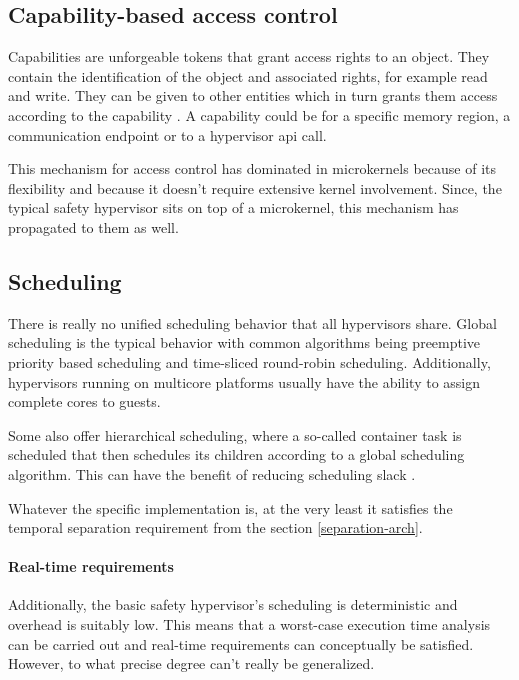 \subsection{Capability-based access control}
Capabilities are unforgeable tokens that grant access rights to an object. They contain the identification of the object and associated rights, for example read and write.
They can be given to other entities which in turn grants them access according to the capability \cite{Levy.1984}. A capability could be for a specific memory region, a communication endpoint or to a hypervisor \acrshort{api} call.

This mechanism for access control has dominated in microkernels because of its flexibility and because it doesn't require extensive kernel involvement. Since, the typical safety hypervisor sits on top of a microkernel, this mechanism has propagated to them as well.

\subsection{Scheduling}
There is really no unified scheduling behavior that all hypervisors share. Global scheduling is the typical behavior with common algorithms being preemptive priority based scheduling and time-sliced round-robin scheduling. Additionally, hypervisors running on multicore platforms usually have the ability to assign complete cores to guests.

Some also offer hierarchical scheduling, where a so-called container task is scheduled that then schedules its children according to a global scheduling algorithm. This can have the benefit of reducing scheduling slack \cite{MalcolmS.Mollison.2010}. 

Whatever the specific implementation is, at the very least it satisfies the temporal separation requirement from the section \ref{separation-arch}. 

\paragraph{Real-time requirements}
Additionally, the basic safety hypervisor's scheduling is deterministic and overhead is suitably low. This means that a worst-case execution time analysis can be carried out and real-time requirements can conceptually be satisfied. However, to what precise degree can't really be generalized.
\begin{comment}
\subsection{Static configuration}
Any mechanism to increase a guests rights at runtime poses the risk of exploitation, be it accidental or purposeful. That is why these systems are typically statically configured and if configuration runtime is at all possible, it is restricted to reducing privilege. For example, a guest that is allowed to spawn other guests may give them his own rights or less than his own but never more.
\end{comment}

